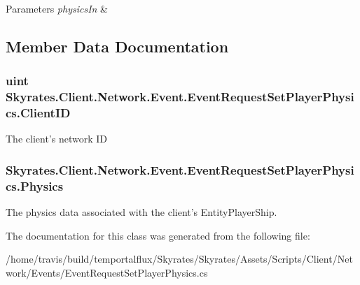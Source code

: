 \begin{DoxyParams}{Parameters}
{\em physics\-In} & \\
\hline
\end{DoxyParams}


\subsection{Member Data Documentation}
\hypertarget{class_skyrates_1_1_client_1_1_network_1_1_event_1_1_event_request_set_player_physics_a3d9f5fe43efb702d71021bce4cc8d36a}{
\subsubsection[{Client\-I\-D}]{\setlength{\rightskip}{0pt plus 5cm}uint Skyrates.\-Client.\-Network.\-Event.\-Event\-Request\-Set\-Player\-Physics.\-Client\-I\-D}}\label{class_skyrates_1_1_client_1_1_network_1_1_event_1_1_event_request_set_player_physics_a3d9f5fe43efb702d71021bce4cc8d36a}


The client's network I\-D 

\hypertarget{class_skyrates_1_1_client_1_1_network_1_1_event_1_1_event_request_set_player_physics_a634e95d2b9518a9591dbb4c0212a42a4}{
\subsubsection[{Physics}]{ Skyrates.\-Client.\-Network.\-Event.\-Event\-Request\-Set\-Player\-Physics.\-Physics}}\label{class_skyrates_1_1_client_1_1_network_1_1_event_1_1_event_request_set_player_physics_a634e95d2b9518a9591dbb4c0212a42a4}


The physics data associated with the client's Entity\-Player\-Ship. 



The documentation for this class was generated from the following file\-:\begin{DoxyCompactItemize}
\item 
/home/travis/build/temportalflux/\-Skyrates/\-Skyrates/\-Assets/\-Scripts/\-Client/\-Network/\-Events/Event\-Request\-Set\-Player\-Physics.\-cs\end{DoxyCompactItemize}

